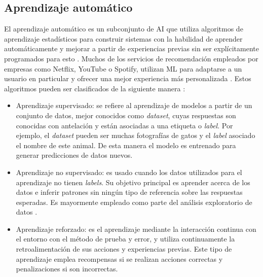\subsection{Aprendizaje automático}
El aprendizaje automático es un subconjunto de AI que utiliza algoritmos de aprendizaje estadísticos para construir sistemas con la habilidad de aprender automáticamente y mejorar a partir de experiencias previas sin ser explícitamente programados para esto \cite{ml_def}. Muchos de los servicios de recomendación empleados por empresas como Netflix, YouTube o Spotify, utilizan ML para adaptarse a un usuario en particular y ofrecer una mejor experiencia más personalizada \cite{ml_apps}. Estos algoritmos pueden ser clasificados de la siguiente manera \cite{ml_types}:
\begin{itemize}
	\item Aprendizaje supervisado: se refiere al aprendizaje de modelos a partir de un conjunto de datos, mejor conocidos como \textit{dataset}, cuyas respuestas son conocidas con antelación y están asociadas a una etiqueta o \textit{label}. Por ejemplo, el \textit{dataset} pueden ser muchas fotografías de gatos y el \textit{label} asociado el nombre de este animal. De esta manera el modelo es entrenado para generar predicciones de datos nuevos.
	
	\item Aprendizaje no supervisado: es usado cuando los datos utilizados para el aprendizaje no tienen \textit{labels}. Su objetivo principal es aprender acerca de los datos e inferir patrones sin ningún tipo de referencia sobre las respuestas esperadas. Es mayormente empleado como parte del análisis exploratorio de datos \cite{ai_ml_dl}.
	
	\item Aprendizaje reforzado: es el aprendizaje mediante la interacción continua con el entorno con el método de prueba y error, y utiliza continuamente la retroalimentación de sus acciones y experiencias previas. Este tipo de aprendizaje emplea recompensas si se realizan acciones correctas y penalizaciones si son incorrectas.
\end{itemize}

\newpage

